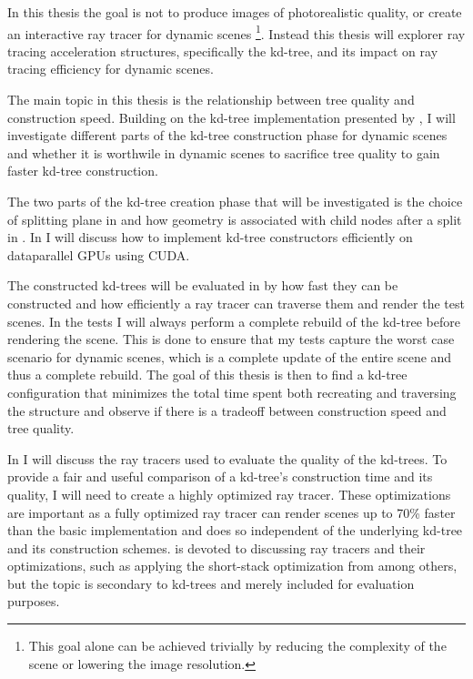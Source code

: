 In this thesis the goal is not to produce images of photorealistic quality, or
create an interactive ray tracer for dynamic scenes \footnote{This goal alone
  can be achieved trivially by reducing the complexity of the scene or lowering
  the image resolution.}. Instead this thesis will explorer ray tracing
acceleration structures, specifically the kd-tree, and its impact on ray tracing
efficiency for dynamic scenes.

The main topic in this thesis is the relationship between tree quality and
construction speed. Building on the kd-tree implementation presented by \zhou{},
I will investigate different parts of the kd-tree construction phase for dynamic
scenes and whether it is worthwile in dynamic scenes to sacrifice tree quality
to gain faster kd-tree construction.

The two parts of the kd-tree creation phase that will be investigated is the
choice of splitting plane in  and how geometry is
associated with child nodes after a split in
. In  I will discuss
how to implement kd-tree constructors efficiently on dataparallel GPUs using
CUDA.

The constructed kd-trees will be evaluated in  by how
fast they can be constructed and how efficiently a ray tracer can traverse them
and render the test scenes. In the tests I will always perform a complete
rebuild of the kd-tree before rendering the scene. This is done to ensure that
my tests capture the worst case scenario for dynamic scenes, which is a complete
update of the entire scene and thus a complete rebuild. The goal of this thesis
is then to find a kd-tree configuration that minimizes the total time spent both
recreating and traversing the structure and observe if there is a tradeoff
between construction speed and tree quality.

In  I will discuss the ray tracers used to evaluate
the quality of the kd-trees. To provide a fair and useful comparison of a
kd-tree's construction time and its quality, I will need to create a highly
optimized ray tracer. These optimizations are important as a fully optimized ray
tracer can render scenes up to 70\% faster than the basic implementation and
does so independent of the underlying kd-tree and its construction
schemes.  is devoted to discussing ray tracers and
their optimizations, such as applying the short-stack optimization from \horn{}
among others, but the topic is secondary to kd-trees and merely included for
evaluation purposes.


